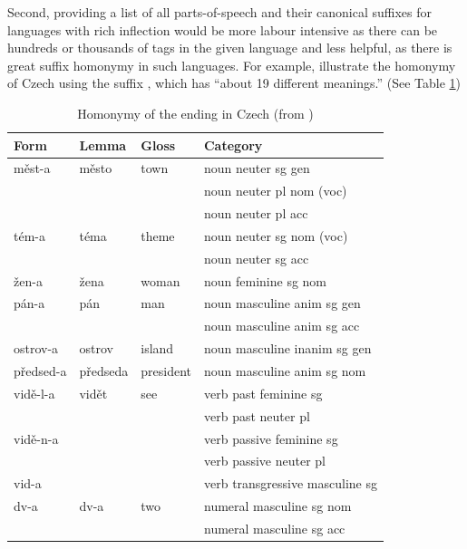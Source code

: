 Second, providing a list of all parts-of-speech and their canonical suffixes for languages with rich inflection would be more labour intensive as there can be hundreds or thousands of tags in the given language and less helpful, as there is great suffix homonymy in such languages. For example, \cite{feldman-hana-2010-rodopi} illustrate the homonymy of Czech using the suffix , which has ``about 19 different meanings.'' (See Table \ref{table:ambiguity-a}) 

\begin{table}[h]
\begin{center}
\begin{tabular}{llll}

%
\toprule
\bf Form      & \bf Lemma    & \bf Gloss  & \bf Category                \\ 
\midrule
m\v{e}st-a    & m\v{e}sto    & town      & noun neuter sg gen           \\
          &          &                   & noun neuter pl nom (voc)     \\
          &          &                   & noun neuter pl acc           \\
t\'{e}m-a     & t\'{e}ma     & theme     & noun neuter sg nom (voc)     \\
          &          &                   & noun neuter sg acc           \\
\v{z}en-a     & \v{z}ena     & woman     & noun feminine sg nom            \\
p\'{a}n-a     & p\'{a}n      & man       & noun masculine anim sg gen      \\
          &          &                   & noun masculine anim sg acc      \\
ostrov-a  & ostrov   & island            & noun masculine inanim sg gen    \\
p\v{r}edsed-a & p\v{r}edseda & president & noun masculine anim sg nom      \\
vid\v{e}-l-a  & vid\v{e}t    & see       & verb past feminine sg           \\
          &          &                   & verb past neuter pl          \\
vid\v{e}-n-a  &          &               & verb passive feminine sg        \\
          &          &                   & verb passive neuter pl       \\
vid-a     &          &                   & verb transgressive masculine sg \\
dv-a      & dv-a     & two               & numeral masculine sg nom        \\
          &          &                   & numeral masculine sg acc        \\
\bottomrule
\end{tabular}
\end{center}
\caption{\label{table:ambiguity-a}Homonymy of the  ending in Czech (from \cite{feldman-hana-2010-rodopi})}
\end{table}

